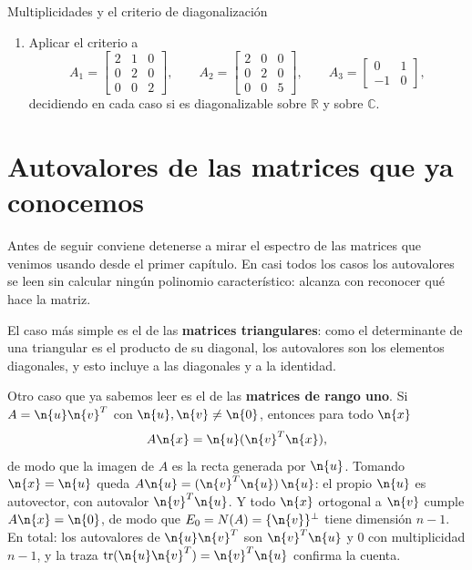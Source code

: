 \begin{entrega}{Multiplicidades y el criterio de diagonalización}
\begin{enumerate}[label=\textbf{(\alph*)},itemsep=3pt,topsep=4pt]
\item Aplicar el criterio a
\[
A_1=\begin{bmatrix}2&1&0\\0&2&0\\0&0&2\end{bmatrix},
\qquad
A_2=\begin{bmatrix}2&0&0\\0&2&0\\0&0&5\end{bmatrix},
\qquad
A_3=\begin{bmatrix}0&1\\-1&0\end{bmatrix},
\]
decidiendo en cada caso si es diagonalizable sobre $\mathbb{R}$ y sobre $\mathbb{C}$.
\end{enumerate}

\medskip
{}
\end{entrega}

\section{Autovalores de las matrices que ya conocemos}
\label{sec:catalogo}

Antes de seguir conviene detenerse a mirar el espectro de las matrices que venimos
usando desde el primer capítulo. En casi todos los casos los autovalores se leen sin
calcular ningún polinomio característico: alcanza con reconocer qué hace la matriz.

El caso más simple es el de las \textbf{matrices triangulares}: como el determinante de
una triangular es el producto de su diagonal, los autovalores son los elementos
diagonales, y esto incluye a las diagonales y a la identidad.

Otro caso que ya sabemos leer es el de las \textbf{matrices de rango uno}. Si
$A=\n{u}\n{v}^T$ con $\n{u},\n{v}\neq\n{0}$, entonces para todo $\n{x}$
\[
A\n{x}=\n{u}(\n{v}^T\n{x}),
\]
de modo que la imagen de $A$ es la recta generada por $\n{u}$. Tomando $\n{x}=\n{u}$
queda $A\n{u}=(\n{v}^T\n{u})\,\n{u}$: el propio $\n{u}$ es autovector, con autovalor
$\n{v}^T\n{u}$. Y todo $\n{x}$ ortogonal a $\n{v}$ cumple $A\n{x}=\n{0}$, de modo que
$E_0=N(A)=\{\n{v}\}^{\perp}$ tiene dimensión $n-1$. En total: los autovalores de
$\n{u}\n{v}^T$ son $\n{v}^T\n{u}$ y $0$ con multiplicidad $n-1$, y la traza
$\operatorname{tr}(\n{u}\n{v}^T)=\n{v}^T\n{u}$ confirma la cuenta.

